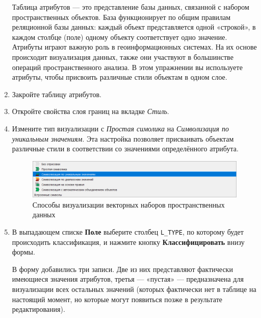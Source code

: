 \documentclass[
  12pt,
]{book}
\begin{document}
\begin{enumerate}
  Таблица атрибутов --- это представление базы данных, связанной с набором пространственных объектов. База функционирует по общим правилам реляционной базы данных: каждый объект представляется одной «строкой», в каждом столбце (поле) одному объекту соответствует одно значение. Атрибуты играют важную роль в геоинформационных системах. На их основе происходит визуализация данных, также они участвуют в большинстве операций пространственного анализа. В этом упражнении вы используете атрибуты, чтобы присвоить различные стили объектам в одном слое.
\item
  Закройте таблицу атрибутов.
\item
  Откройте свойства слоя границ на вкладке \emph{Стиль}.
\item
  Измените тип визуализации с \emph{Простая симолика} на \emph{Символизация по уникальным значениям}. Эта настройка позволяет присваивать объектам различные стили в соответствии со значениями определённого атрибута.

  \begin{figure}
  \centering
  \includegraphics{images/Ex01_MapGeneral/style6.png}
  \caption{Способы визуализации векторных наборов пространственных данных}
  \end{figure}
\item
  В выпадающем списке \textbf{Поле} выберите столбец \texttt{L\_TYPE}, по которому будет происходить классификация, и нажмите кнопку \textbf{Классифицировать} внизу формы.

  В форму добавились три записи. Две из них представляют фактически имеющиеся значения атрибутов, третья --- «пустая» --- предназначена для визуализации всех остальных значений (которых фактически нет в таблице на настоящий момент, но которые могут появиться позже в результате редактирования).


\end{enumerate}
\end{document}
